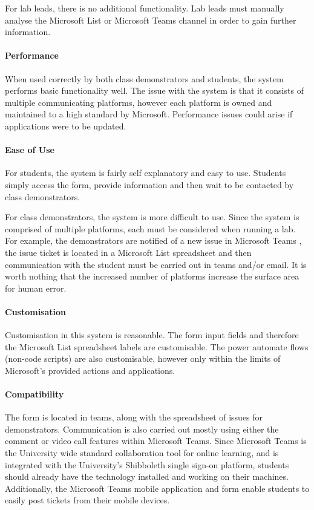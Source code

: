 For lab leads, there is no additional functionality. Lab leads must manually analyse the Microsoft List or Microsoft Teams \cite{teams} channel in order to gain further information. 

\paragraph{Performance}  
When used correctly by both class demonstrators and students, the system performs basic functionality well. The issue with the system is that it consists of multiple communicating platforms, however each platform is owned and maintained to a high standard by Microsoft. Performance issues could arise if applications were to be updated.

\paragraph{Ease of Use} 
For students, the system is fairly self explanatory and easy to use. Students simply access the form, provide information and then wait to be contacted by class demonstrators.

For class demonstrators, the system is more difficult to use. Since the system is comprised of multiple platforms, each must be considered when running a lab. For example, the demonstrators are notified of a new issue in Microsoft Teams \cite{teams}, the issue ticket is located in a Microsoft List spreadsheet and then communication with the student must be carried out in teams and/or email. It is worth nothing that the increased number of platforms increase the surface area for human error.


\paragraph{Customisation} 
Customisation in this system is reasonable. The form input fields and therefore the Microsoft List spreadsheet labels are customisable. The power automate \cite{pauto} flows (non-code scripts) are also customisable, however only within the limits of Microsoft's provided actions and applications.

\paragraph{Compatibility}  
The form is located in teams, along with the spreadsheet of issues for demonstrators. Communication is also carried out mostly using either the comment or video call features within Microsoft Teams. Since Microsoft Teams is the University wide standard collaboration tool for online learning, and is integrated with the University's Shibboleth \cite{shib} single sign-on platform, students should already have the technology installed and working on their machines. Additionally, the Microsoft Teams mobile application and form enable students to easily post tickets from their mobile devices.

